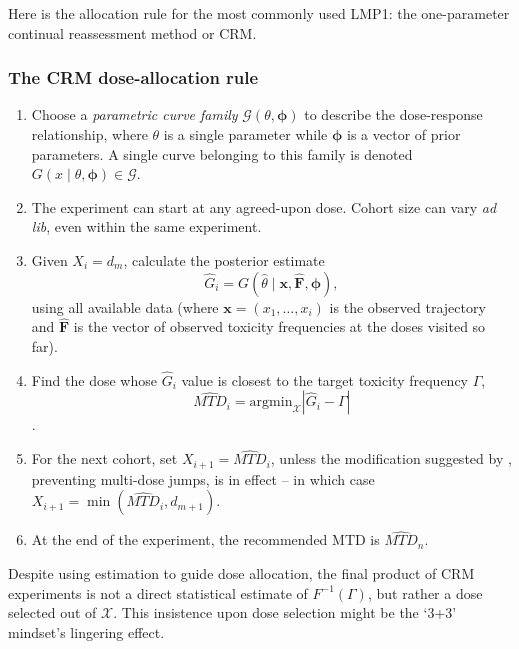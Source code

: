 Here is the allocation rule for the most commonly used LMP1: the one-parameter continual reassessment method or CRM.

\subsubsection{The CRM dose-allocation rule \citep{O'Qu:Pepe:Fish:cont:1990}}
\begin{enumerate}
\item Choose a \emph{parametric curve family} $\mathcal{G}\left(\theta,\boldsymbol{\phi}\right)$ to describe the dose-response relationship, where $\theta$ is a single parameter while $\boldsymbol{\phi}$ is a vector of prior parameters. A single curve belonging to this family is denoted\ $G\left(x\mid\theta,\boldsymbol{\phi}\right)\in\mathcal{G}$.
\item The experiment can start at any agreed-upon dose. Cohort size can vary \emph{ad lib}, even within the same experiment.
\item Given $X_i=d_m$, calculate the posterior estimate
$$\hat{G}_i=G\left(\hat{\theta}\mid \mathbf{x,\hat{F}},\boldsymbol{\phi}\right),$$
using all available data (where  $\mathbf{x}=\left(x_1,\ldots ,x_i\right)$ is the observed trajectory and $\mathbf{\hat{F}}$ is the vector of observed toxicity frequencies at the doses visited so far).
\item Find the dose whose $\hat{G}_i$ value is closest to the target toxicity frequency $\Gamma$, $$\widehat{MTD}_i=\mathrm{arg min}_{\mathcal{X}}\left|\hat{G}_i-\Gamma\right|$$.
\item For the next cohort, set $X_{i+1}=\widehat{MTD}_i$, unless the modification suggested by \cite{Good:Zahu:Pian:some:1995}, preventing multi-dose jumps, is in effect -- in which case $X_{i+1}=\min\left(\widehat{MTD}_i,d_{m+1}\right)$.
\item At the end of the experiment, the recommended MTD is $\widehat{MTD}_n$.
\end{enumerate}

\noindent Despite using estimation to guide dose allocation, the final product of CRM experiments is not a direct statistical estimate of $F^{-1}(\Gamma)$, but rather a dose selected out of $\mathcal{X}$. This insistence upon dose selection might be the `3+3' mindset's lingering effect.

